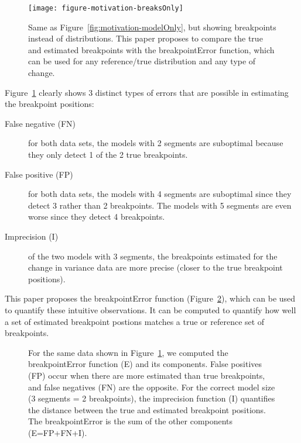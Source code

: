 \documentclass{jsfds} %
\begin{document}
\begin{figure}[H]
  \centering
  \texttt{[image: figure-motivation-breaksOnly]}
  \vskip -0.5cm
  \caption{Same as Figure~\ref{fig:motivation-modelOnly}, but showing
    breakpoints instead of distributions. This paper proposes to
    compare the true and estimated breakpoints with the
    breakpointError function, which can be used for any reference/true
    distribution and any type of change. }
  \label{fig:motivation-breaksOnly}
\end{figure}

\newpage

Figure~\ref{fig:motivation-breaksOnly} clearly shows 3 distinct types
of errors that are possible in estimating the breakpoint positions:
\begin{description}
\item[False negative (FN)] for both data sets, the models with 2
segments are suboptimal because they only detect 1 of the 2 true
breakpoints.
\item[False positive (FP)] for both data sets, the models with 4
  segments are suboptimal since they detect 3 rather than 2
  breakpoints. The models with 5 segments are even worse since they
  detect 4 breakpoints.
\item[Imprecision (I)] of the two models with 3 segments, the
  breakpoints estimated for the change in variance data are more
  precise (closer to the true breakpoint positions).
\end{description}

This paper proposes the breakpointError function
(Figure~\ref{fig:motivation-breakpointError}), which can be used to
quantify these intuitive observations. It can be computed to quantify
how well a set of estimated breakpoint postions matches a true or
reference set of breakpoints.


\begin{figure}[H]
  \centering
  
  \vskip -0.7cm
  \caption{For the same data shown in
    Figure~\ref{fig:motivation-breaksOnly}, we computed the
    breakpointError function (E) and its components. False positives
    (FP) occur when there are more estimated than true breakpoints,
    and false negatives (FN) are the opposite. For the correct model
    size (3 segments = 2 breakpoints), the imprecision function (I)
    quantifies the distance between the true and estimated breakpoint
    positions. The breakpointError is the sum of the other components
    (E=FP+FN+I).}
  \label{fig:motivation-breakpointError}
\end{figure}
\end{document}
